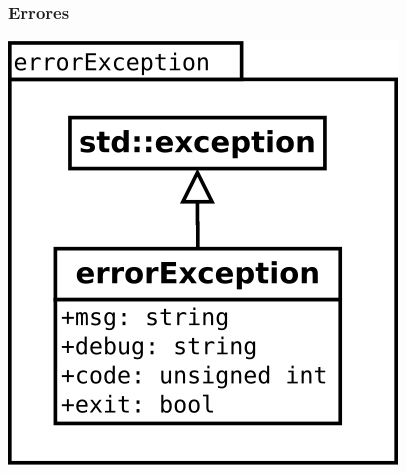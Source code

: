 \subsubsection {Errores} 
\begin{center}
\includegraphics[scale=0.4]{errorException.png} \\
\end{center}



